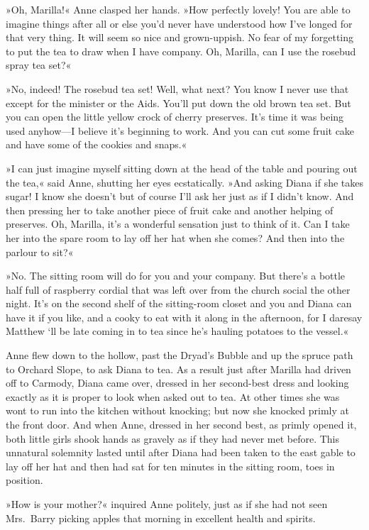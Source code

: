 »Oh, Marilla!« Anne clasped her hands. »How perfectly lovely! You are able to imagine things after all or else you'd never have understood how I've longed for that very thing. It will seem so nice and grown-uppish. No fear of my forgetting to put the tea to draw when I have company. Oh, Marilla, can I use the rosebud spray tea set?«

»No, indeed! The rosebud tea set! Well, what next? You know I never use that except for the minister or the Aids. You'll put down the old brown tea set. But you can open the little yellow crock of cherry preserves. It's time it was being used anyhow—I believe it's beginning to work. And you can cut some fruit cake and have some of the cookies and snaps.«

»I can just imagine myself sitting down at the head of the table and pouring out the tea,« said Anne, shutting her eyes ecstatically. »And asking Diana if she takes sugar! I know she doesn't but of course I'll ask her just as if I didn't know. And then pressing her to take another piece of fruit cake and another helping of preserves. Oh, Marilla, it's a wonderful sensation just to think of it. Can I take her into the spare room to lay off her hat when she comes? And then into the parlour to sit?«

»No. The sitting room will do for you and your company. But there's a bottle half full of raspberry cordial that was left over from the church social the other night. It's on the second shelf of the sitting-room closet and you and Diana can have it if you like, and a cooky to eat with it along in the afternoon, for I daresay Matthew `ll be late coming in to tea since he's hauling potatoes to the vessel.«

Anne flew down to the hollow, past the Dryad's Bubble and up the spruce path to Orchard Slope, to ask Diana to tea. As a result just after Marilla had driven off to Carmody, Diana came over, dressed in her second-best dress and looking exactly as it is proper to look when asked out to tea. At other times she was wont to run into the kitchen without knocking; but now she knocked primly at the front door. And when Anne, dressed in her second best, as primly opened it, both little girls shook hands as gravely as if they had never met before. This unnatural solemnity lasted until after Diana had been taken to the east gable to lay off her hat and then had sat for ten minutes in the sitting room, toes in position.

»How is your mother?« inquired Anne politely, just as if she had not seen Mrs.~Barry picking apples that morning in excellent health and spirits.

